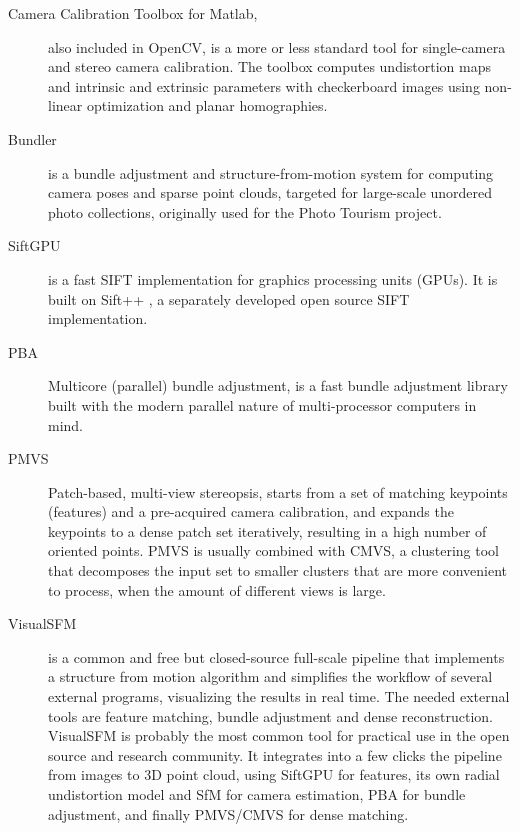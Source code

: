 \begin{description}
	\item[Camera Calibration Toolbox for Matlab,] \cite{camcalmatlab} also included in OpenCV, is a more or less standard tool for single-camera and stereo camera calibration.
		The toolbox computes undistortion maps and intrinsic and extrinsic parameters with checkerboard images using non-linear optimization and planar homographies.

	\item[Bundler] \cite{snavely2006photo} is a bundle adjustment and structure-from-motion system for computing camera poses and sparse point clouds, targeted for large-scale unordered photo collections, originally used for the Photo Tourism project.

	\item[SiftGPU] \cite{changchang2007siftgpu} is a fast SIFT implementation for graphics processing units (GPUs).
		It is built on Sift++ \cite{vedaldi2011sift++}, a separately developed open source SIFT implementation.

	\item[PBA] \cite{wu2011multicore} Multicore (parallel) bundle adjustment, is a fast bundle adjustment library built with the modern parallel nature of multi-processor computers in mind.

	\item[PMVS] \cite{furukawa2010accurate,furukawa2012patch} Patch-based, multi-view stereopsis, starts from a set of matching keypoints (features) and a pre-acquired camera calibration, and expands the keypoints to a dense patch set iteratively, resulting in a high number of oriented points.
		PMVS is usually combined with CMVS, a clustering tool that decomposes the input set to smaller clusters that are more convenient to process, when the amount of different views is large.

	\item[VisualSFM] \cite{wu2013towards} is a common and free but closed-source full-scale pipeline that implements a structure from motion algorithm and simplifies the workflow of several external programs, visualizing the results in real time.
		The needed external tools are feature matching, bundle adjustment and dense reconstruction.
		VisualSFM is probably the most common tool for practical use in the open source and research community.
		It integrates into a few clicks the pipeline from images to 3D point cloud, using SiftGPU for features, its own radial undistortion model and SfM for camera estimation, PBA for bundle adjustment, and finally PMVS/CMVS for dense matching.


\end{description}
